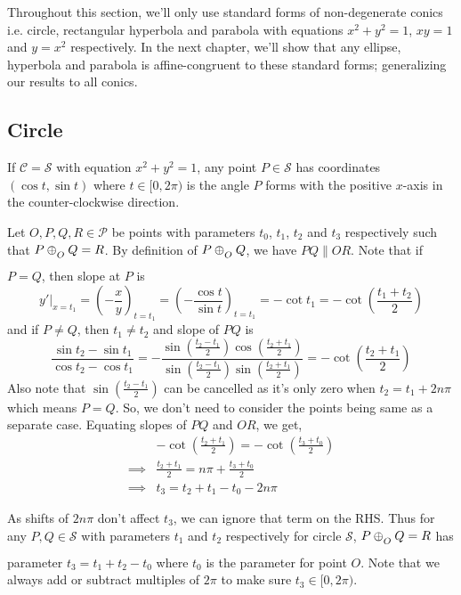 Throughout this section, we'll only use standard forms of non-degenerate conics
i.e. circle, rectangular hyperbola and parabola with equations $x^2+y^2=1$, $xy=1$
and $y=x^2$ respectively. In the next chapter, we'll show that any ellipse,
hyperbola and parabola is affine-congruent to these standard forms; generalizing
our results to all conics.

\subsection*{Circle}

If $\mathcal{C}=\mathcal{S}$ with equation $x^2+y^2=1$, any point
$P\in\mathcal{S}$ has coordinates $(\cos t,\sin t)$ where $t\in[0,2\pi)$ is the
angle $P$ forms with the positive $x$-axis in the counter-clockwise direction.
\vspace{1ex}

Let $O,P,Q,R\in\mathcal{P}$ be points with parameters $t_0$, $t_1$, $t_2$ and
$t_3$ respectively such that $P \conop Q = R$. By definition of $P \conop Q$, we
have $PQ \parallel OR$. Note that if $P=Q$, then slope at $P$ is
\[
    y'|_{x=t_1} = \left(-\frac{x}{y}\right)_{t=t_1}
    = \left(-\frac{\cos t}{\sin t}\right)_{t=t_1}
                = -\cot t_1
                = -\cot \left(\frac{t_1+t_2}{2}\right)
\]
and if $P \neq Q$, then $t_1 \neq t_2$ and slope of $PQ$ is 
\[
    \frac{\sin t_2 - \sin t_1}{\cos t_2 - \cos t_1}
    = -\frac{\sin\left(\frac{t_2-t_1}{2}\right)\cos\left(\frac{t_2+t_1}{2}\right)}{\sin\left(\frac{t_2-t_1}{2}\right)\sin\left(\frac{t_2+t_1}{2}\right)}
    = -\cot\left(\frac{t_2+t_1}{2}\right)
\]
Also note that $\sin\left(\frac{t_2 - t_1}{2}\right)$ can be cancelled as it's
only zero when $t_2=t_1+2n\pi$ which means $P=Q$. So, we don't need to consider
the points being same as a separate case. Equating slopes of $PQ$ and $OR$, we
get,
\begin{align*}
    &-\cot\left(\frac{t_2+t_1}{2}\right) = -\cot\left(\frac{t_3+t_0}{2}\right) \\
    \implies& \frac{t_2+t_1}{2} = n\pi+\frac{t_3+t_0}{2} \\
    \implies& t_3 = t_2 + t_1 - t_0 - 2n\pi
\end{align*}

\noindent
As shifts of $2n\pi$ don't affect $t_3$, we can ignore that term on the RHS.
Thus for any $P,Q\in\mathcal{S}$ with parameters $t_1$ and $t_2$
respectively for circle $\mathcal{S}$, $P \conop Q = R$ has parameter
$t_3 = t_1 + t_2 - t_0$ where $t_0$ is the parameter for point
$O$. Note that we always add or subtract multiples of $2\pi$ to make sure
$t_3\in[0,2\pi)$.
\vspace{1ex}


